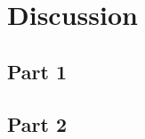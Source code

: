 \section{Discussion}

  \subsection{Part 1}
  \lipsum[1]

  \subsection{Part 2}
  \lipsum[1]

\newpage
